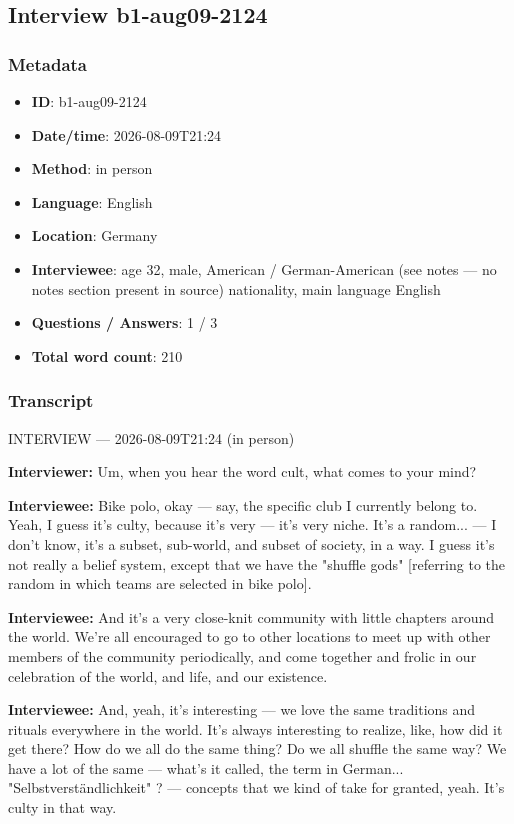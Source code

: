 \subsection{Interview b1-aug09-2124}\label{int:b1-aug09-2124}
\subsubsection*{Metadata}
\begin{itemize}
  \item \textbf{ID}: b1-aug09-2124
  \item \textbf{Date/time}: 2026-08-09T21:24
  \item \textbf{Method}: in person
  \item \textbf{Language}: English
  \item \textbf{Location}: Germany
  \item \textbf{Interviewee}: age 32, male, American / German-American (see notes — no notes section present in source) nationality, main language English
  \item \textbf{Questions / Answers}: 1 / 3
  \item \textbf{Total word count}: 210
\end{itemize}
\subsubsection*{Transcript}
INTERVIEW — 2026-08-09T21:24 (in person)

\textbf{Interviewer:} Um, when you hear the word cult, what comes to your mind?

\textbf{Interviewee:} Bike polo, okay — say, the specific club I currently belong to. Yeah, I guess it's culty, because it's very — it's very niche. It's a random... — I don't know, it's a subset, sub-world, and subset of society, in a way. I guess it's not really a belief system, except that we have the "shuffle gods" [referring to the random in which teams are selected in bike polo].

\textbf{Interviewee:} And it's a very close-knit community with little chapters around the world. We're all encouraged to go to other locations to meet up with other members of the community periodically, and come together and frolic in our celebration of the world, and life, and our existence.

\textbf{Interviewee:} And, yeah, it's interesting — we love the same traditions and rituals everywhere in the world. It's always interesting to realize, like, how did it get there? How do we all do the same thing? Do we all shuffle the same way? We have a lot of the same — what's it called, the term in German... "Selbstverständlichkeit" ? — concepts that we kind of take for granted, yeah. It's culty in that way.

